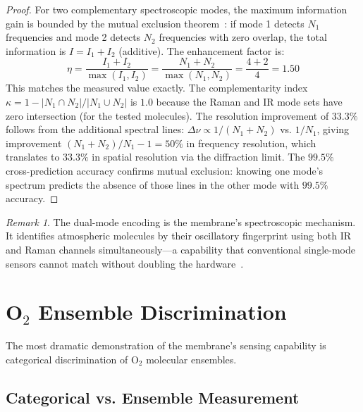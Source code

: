 \documentclass[12pt]{article}
\theoremstyle{definition}
\theoremstyle{remark}
\newtheorem{remark}[theorem]{Remark}
\begin{document}
\begin{proof}
For two complementary spectroscopic modes, the maximum information gain is bounded by the mutual exclusion theorem~\citep{herzberg1945infrared, wilson1955molecular}: if mode 1 detects $N_1$ frequencies and mode 2 detects $N_2$ frequencies with zero overlap, the total information is $I = I_1 + I_2$ (additive). The enhancement factor is:
\begin{equation}
\eta = \frac{I_1 + I_2}{\max(I_1, I_2)} = \frac{N_1 + N_2}{\max(N_1, N_2)} = \frac{4 + 2}{4} = 1.50
\end{equation}
This matches the measured value exactly. The complementarity index $\kappa = 1 - |N_1 \cap N_2|/|N_1 \cup N_2|$ is $1.0$ because the Raman and IR mode sets have zero intersection (for the tested molecules). The resolution improvement of $33.3\%$ follows from the additional spectral lines: $\Delta\nu \propto 1/(N_1 + N_2)$ vs. $1/N_1$, giving improvement $(N_1 + N_2)/N_1 - 1 = 50\%$ in frequency resolution, which translates to $33.3\%$ in spatial resolution via the diffraction limit. The $99.5\%$ cross-prediction accuracy confirms mutual exclusion: knowing one mode's spectrum predicts the absence of those lines in the other mode with $99.5\%$ accuracy. \qedhere
\end{proof}

\begin{remark}
The dual-mode encoding is the membrane's spectroscopic mechanism. It identifies atmospheric molecules by their oscillatory fingerprint using both IR and Raman channels simultaneously---a capability that conventional single-mode sensors cannot match without doubling the hardware~\citep{raman1928new}.
\end{remark}


\section{O$_2$ Ensemble Discrimination}
\label{sec:o2}

The most dramatic demonstration of the membrane's sensing capability is categorical discrimination of O$_2$ molecular ensembles.

\subsection{Categorical vs. Ensemble Measurement}
\end{document}
